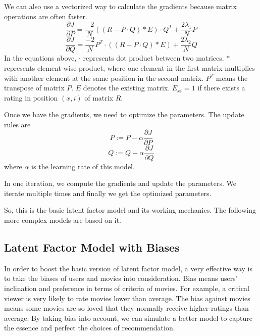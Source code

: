 \documentclass[sigconf]{acmart}
\begin{document}
{We can also use a vectorized way to calculate the gradients because matrix operations are often faster.
\begin{equation}
    \frac{\partial J}{\partial P} = \frac{-2}{N} ((R - P \cdot Q)*E)\cdot Q^T + \frac{2\lambda_1}{N} P
\end{equation}
\begin{equation}
    \frac{\partial J}{\partial Q} = \frac{-2}{N} P^T \cdot ((R - P \cdot Q)*E) + \frac{2\lambda_2}{N} Q
\end{equation}
In the equations above, $\cdot$ represents dot product between two matrices. $*$ represents element-wise product, where one element in the first matrix multiplies with another element at the same position in the second matrix. $P^T$ means the transpose of matrix $P$. $E$ denotes the existing matrix. $E_{xi} = 1$ if there exists a rating in position $(x,i)$ of matrix $R$.

Once we have the gradients, we need to optimize the parameters. The update rules are
\begin{equation}
    P := P - \alpha \frac{\partial J}{\partial P}
\end{equation}
\begin{equation}
    Q := Q - \alpha \frac{\partial J}{\partial Q}
\end{equation}
where $\alpha$ is the learning rate of this model.

In one iteration, we compute the gradients and update the parameters. We iterate multiple times and finally we get the optimized parameters.

So, this is the basic latent factor model and its working mechanics. The following more complex models are based on it.

}

\subsection{Latent Factor Model with Biases}

In order to boost the basic version of latent factor model, a very effective way is to take the biases of users and movies into consideration. Bias means users' inclination and preference in terms of criteria of movies. For example, a critical viewer is very likely to rate movies lower than average. The bias against movies means some movies are so loved that they normally receive higher ratings than average. By taking bias into account, we can simulate a better model to capture the essence and perfect the choices of recommendation.
\end{document}
